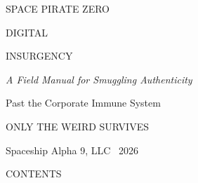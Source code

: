\begingroup
\thispagestyle{empty}
\centering
\vspace*{\fill}
{\displaysemi\color{cyan}\large SPACE PIRATE ZERO\par}
\vspace{8pt}{\color{pink}\rule{0.9\linewidth}{3pt}}\par
\vspace{26pt}
{\displayfont\color{pink}\fontsize{40}{44}\selectfont DIGITAL\par INSURGENCY\par}
\vspace{20pt}
{\itshape\color{paper}\large A Field Manual for Smuggling Authenticity\par
Past the Corporate Immune System\par}
\vspace{12pt}{\color{cyan}\rule{0.9\linewidth}{1pt}}\par
\vspace*{\fill}
{\ttfamily\color{cyan}\small ONLY THE WEIRD SURVIVES\par}
\vspace{6pt}
{\color{muted}\small Spaceship Alpha 9, LLC \textbullet\ 2026\par}
\endgroup
\clearpage

\begingroup
{\displayfont\color{pink}\LARGE CONTENTS\par}
\vspace{6pt}{\color{cyan}\rule{\linewidth}{1pt}}\par
\vspace{12pt}
\makeatletter{}\makeatother
\endgroup
\clearpage
